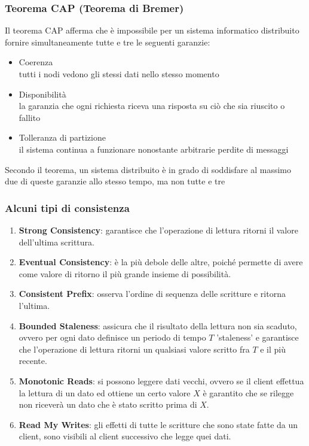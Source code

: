 \begin{frame}
\frametitle{Teorema CAP (Teorema di Bremer)}
	\begin{definizione}
	 Il \alert{teorema CAP} afferma che è impossibile per un sistema informatico distribuito fornire simultaneamente tutte e tre le seguenti garanzie:
	\begin{itemize}
		\item Coerenza\\
		tutti i nodi vedono gli stessi dati nello stesso momento
		\item Disponibilità\\
	    la garanzia che ogni richiesta riceva una risposta su ciò che sia riuscito o fallito
		\item Tolleranza di partizione\\
		il sistema continua a funzionare nonostante arbitrarie perdite di messaggi
	\end{itemize}
	Secondo il teorema, un sistema distribuito è in grado di soddisfare al massimo due di queste garanzie allo stesso tempo, ma non tutte e tre
	\end{definizione}
\end{frame}

\begin{frame}
\frametitle{Alcuni tipi di consistenza}
\begin{enumerate}
  \item \textbf{Strong Consistency}: garantisce che l'operazione di lettura ritorni il valore dell'ultima scrittura.
  \item \textbf{Eventual Consistency}: è la più debole delle altre, poiché permette di avere come valore di ritorno il più grande insieme di possibilità.
  \item \textbf{Consistent Prefix}: osserva l'ordine di sequenza delle scritture e ritorna l'ultima.
  \item \textbf{Bounded Staleness}: assicura che il risultato della lettura non sia scaduto, ovvero per ogni dato definisce un periodo di tempo $T$ 'staleness' e garantisce che l'operazione di lettura ritorni un qualsiasi valore scritto fra $T$ e il più recente.
  \item \textbf{Monotonic Reads}: si possono leggere dati vecchi, ovvero se il client effettua la lettura di un dato ed ottiene un certo valore $X$ è garantito che se rilegge non riceverà un dato che è stato scritto prima di $X$. 
  \item \textbf{Read My Writes}: gli effetti di tutte le scritture che sono state fatte da un client, sono visibili al client successivo che legge quei dati.
\end{enumerate}
\end{frame}

